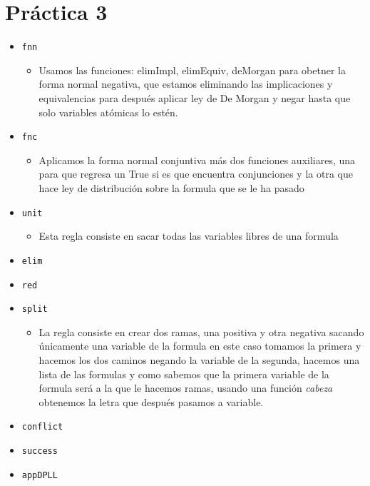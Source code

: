 \documentclass{article}
\newcommand{\code}[1]{\textcolor{white!25!black}{\texttt{#1}}}
\begin{document}
\section*{\LARGE{Práctica 3}}
\newcommand{\localtextbulletone}{\textcolor{black}{\raisebox{.45ex}{\rule{.6ex}{.6ex}}}}
\renewcommand{\labelitemi}{\localtextbulletone}
\begin{itemize}
\item \code{fnn}
    \begin{itemize}
        \item Usamos las funciones: elimImpl, elimEquiv, deMorgan para obetner la forma normal negativa, que estamos eliminando las implicaciones y equivalencias para después aplicar ley de De Morgan y negar hasta que solo variables atómicas lo estén. 
    \end{itemize}
    
\item \code{fnc}
    \begin{itemize}
        \item Aplicamos la forma normal conjuntiva más dos funciones auxiliares, una para que regresa un True si es que encuentra conjunciones y la otra que hace ley de distribución sobre la formula que se le ha pasado
    \end{itemize}
    
\item \code{unit}
    \begin{itemize}
        \item Esta regla consiste en sacar todas las variables libres de una formula 
    \end{itemize}
    
\item \code{elim}

\item \code{red}

\item \code{split}
    \begin{itemize}
        \item La regla consiste en crear dos ramas, una positiva y otra negativa sacando únicamente una variable de la formula en este caso tomamos la primera y hacemos los dos caminos negando la variable de la segunda, hacemos una lista de las formulas y como sabemos que la primera variable de la formula será a la que le hacemos ramas, usando una función \textit{cabeza} obtenemos la letra que después pasamos a variable.  
    \end{itemize}

\item \code{conflict}
\item \code{success}
\item \code{appDPLL}
\end{itemize}

\begin{center}
\end{center}
\end{document}

